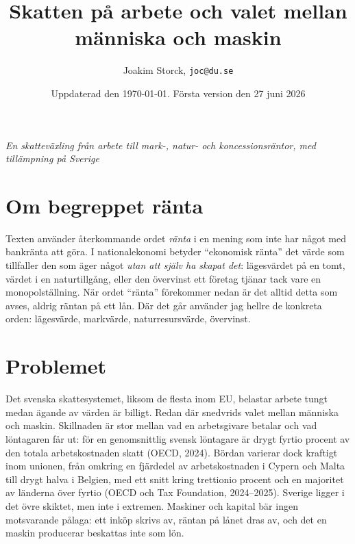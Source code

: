 \documentclass[11pt]{article}
\title{Skatten på arbete och valet mellan människa och maskin}
\author{Joakim Storck, \texttt{joc@du.se}}
\date{Uppdaterad den \today. Första version den 27 juni 2026}
\begin{document}
\maketitle

\begin{center}
\textit{En skatteväxling från arbete till mark-, natur- och koncessionsräntor, med tillämpning på Sverige}
\end{center}

\vspace{1em}

\section*{Om begreppet ränta}

Texten använder återkommande ordet \emph{ränta} i en mening som inte har något med bankränta att göra. I nationalekonomi betyder \enquote{ekonomisk ränta} det värde som tillfaller den som äger något \emph{utan att själv ha skapat det}: lägesvärdet på en tomt, värdet i en naturtillgång, eller den övervinst ett företag tjänar tack vare en monopol\-ställning. När ordet \enquote{ränta} förekommer nedan är det alltid detta som avses, aldrig räntan på ett lån. Där det går använder jag hellre de konkreta orden: lägesvärde, markvärde, naturresursvärde, övervinst.

\section{Problemet}

Det svenska skattesystemet, liksom de flesta inom EU, belastar arbete tungt medan ägande av värden är billigt. Redan där snedvrids valet mellan människa och maskin. Skillnaden är stor mellan vad en arbetsgivare betalar och vad löntagaren får ut: för en genomsnittlig svensk löntagare är drygt fyrtio procent av den totala arbetskostnaden skatt (OECD, 2024). Bördan varierar dock kraftigt inom unionen, från omkring en fjärdedel av arbetskostnaden i Cypern och Malta till drygt halva i Belgien, med ett snitt kring trettionio procent och en majoritet av länderna över fyrtio (OECD och Tax Foundation, 2024--2025). Sverige ligger i det övre skiktet, men inte i extremen. Maskiner och kapital bär ingen motsvarande pålaga: ett inköp skrivs av, räntan på lånet dras av, och det en maskin producerar beskattas inte som lön.
\end{document}
